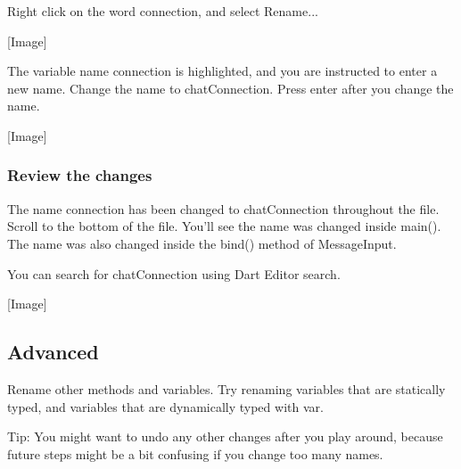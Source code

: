 Right click on the word connection, and select Rename...

[Image]

The variable name connection is highlighted, and you are instructed to enter a new name. Change the name to chatConnection. Press enter after you change the name.

[Image]

\subsubsection{Review the changes}

The name connection has been changed to chatConnection throughout the file. Scroll to the bottom of the file. You’ll see the name was changed inside main(). The name was also changed inside the bind() method of MessageInput.

You can search for chatConnection using Dart Editor search.

[Image]

\subsection{Advanced}

Rename other methods and variables. Try renaming variables that are statically typed, and variables that are dynamically typed with var.

Tip: You might want to undo any other changes after you play around, because future steps might be a bit confusing if you change too many names.
